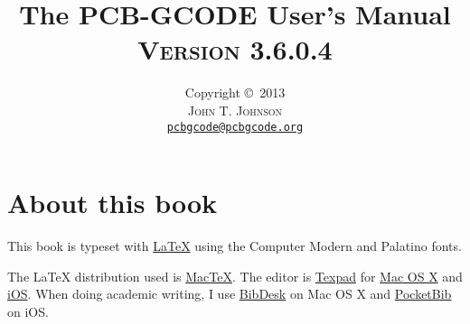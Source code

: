 \documentclass[11pt]{book}
\title{\vspace{-15mm}\fontsize{24pt}{10pt}\selectfont\textbf{The PCB-GCODE User's Manual}\\[1em]
\fontsize{18pt}{10pt}\textsc{Version 3.6.0.4}\\[1em]
}
\author{
\large
Copyright \copyright\ 2013\\[1em]
\textsc{John T. Johnson}\\[2mm] %
\normalsize \href{mailto:pcbgcode@pcbgcode.org}{\texttt{pcbgcode@pcbgcode.org}} %
\vspace{-5mm}
}
\begin{document}


\newcommand{\warning}[1]{
	\marginpar{
		\vspace{0.1in}
		\texttt{[image: /Users/john/Dropbox/Docs/warning.pdf]}
		\centering
		#1
	}
}

\newcommand{\information}[1]{
	\marginpar{
		\vspace{0.1in}
		\texttt{[image: /Users/john/Dropbox/Docs/information.pdf]}
		\centering
		#1
	}
}

\newcommand{\howitworks}[1]{
	\marginpar{
		\vspace{0.1in}
		\texttt{[image: /Users/john/Dropbox/Docs/gears.pdf]}
		\centering
		#1
	}
}


  
\setlength{\marginparwidth}{1.0in}
\setlength{\marginparsep}{2em}


\newcommand{\code}[1]{\texttt{#1}}



\frontmatter

\maketitle

%
%
\section*{About this book}

This book is typeset with \href{http://en.wikipedia.org/wiki/LaTeX}{\LaTeX{}} using the Computer Modern and Palatino fonts.
\vspace{1ex}

\noindent The \LaTeX{} distribution used is \href{http://tug.org/mactex/}{MacTeX}. The editor is \href{http://texpadapp.com}{Texpad} for \href{http://www.apple.com/osx/}{Mac OS X} and \href{http://www.apple.com/ios/}{iOS}. When doing academic writing, I use \href{http://bibdesk.sourceforge.net}{BibDesk} on Mac OS X and \href{https://itunes.apple.com/us/app/pocketbib-for-bibtex-bibdesk/id524521749?mt=8}{PocketBib} on iOS.
\vspace{1ex}
\end{document}
